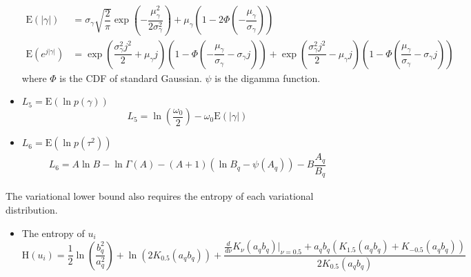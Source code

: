 \documentclass[12pt]{article}
\begin{document}
\begin{itemize}
    \begin{align}
      \mathrm{E}\left(\left|\gamma\right|\right) &= \sigma_{\gamma}\sqrt{\dfrac{2}{\pi}}\exp\left(-\dfrac{\mu_{\gamma}^{2}}{2\sigma_{\gamma}^{2}}\right)+\mu_{\gamma}\left(1-2\Phi\left(-\dfrac{\mu_{\gamma}}{\sigma_{\gamma}}\right)\right)\\
      \mathrm{E}\left(e^{j\left|\gamma\right|}\right) &= \exp\left(\dfrac{\sigma_{\gamma}^{2}j^{2}}{2}+\mu_{\gamma}j\right)\left(1-\Phi\left(-\dfrac{\mu_{\gamma}}{\sigma_{\gamma}}-\sigma_{\gamma}j\right)\right)+\exp\left(\dfrac{\sigma_{\gamma}^{2}j^{2}}{2}-\mu_{\gamma}j\right)\left(1-\Phi\left(\dfrac{\mu_{\gamma}}{\sigma_{\gamma}}-\sigma_{\gamma}j\right)\right)
    \end{align}
    where $\Phi$ is the CDF of standard Gaussian. $\psi$ is the digamma function.
    \item $L_{5} = \mathrm{E}\left(\ln p\left(\gamma\right)\right)$
    \begin{equation}
      L_{5} = \ln\left(\dfrac{\omega_{0}}{2}\right)-\omega_{0}\mathrm{E}\left(\left|\gamma\right|\right)
    \end{equation}
    \item $L_{6}=\mathrm{E}\left(\ln p\left(\tau^{2}\right)\right)$
    \begin{align}
      L_{6} = A\ln B -\ln\Gamma\left(A\right)-\left(A+1\right)\left(\ln B_{q}-\psi\left(A_{q}\right)\right)-B\dfrac{A_{q}}{B_{q}}
    \end{align}
  \end{itemize}
  The variational lower bound also requires the entropy of each variational distribution.
  \begin{itemize}
    \item The entropy of $u_{i}$
    \begin{equation}
      \mathrm{H}\left(u_{i}\right) = \dfrac{1}{2}\ln\left(\dfrac{b_{q}^{2}}{a_{q}^{2}}\right)+\ln\left(2K_{0.5}\left(a_{q}b_{q}\right)\right)+\dfrac{\frac{d}{d\nu}K_{\nu}\left(a_{q}b_{q}\right)\Big|_{\nu=0.5}+a_{q}b_{q}\left(K_{1.5}\left(a_{q}b_{q}\right)+K_{-0.5}\left(a_{q}b_{q}\right)\right)}{2K_{0.5}\left(a_{q}b_{q}\right)}
    \end{equation}
  \end{itemize}
\end{document}

